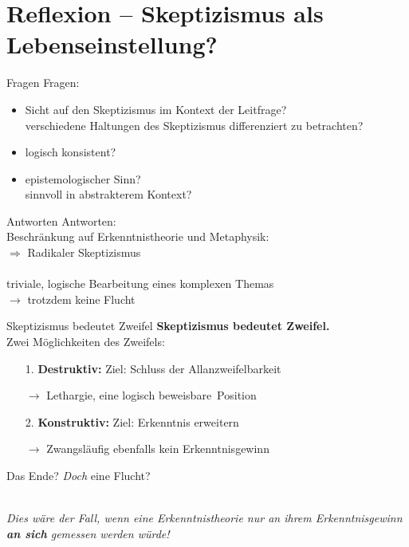 \documentclass[12pt]{beamer}
\begin{document}
\section{Reflexion – Skeptizismus als Lebenseinstellung?}
\begin{frame}{Fragen}
Fragen:
\begin{itemize}
\item Sicht auf den Skeptizismus im Kontext der Leitfrage?\\
verschiedene Haltungen des Skeptizismus differenziert zu betrachten?
\item logisch konsistent?
\item epistemologischer Sinn?\\
sinnvoll in abstrakterem Kontext? %
\end{itemize}
\end{frame}

\begin{frame}{Antworten}
Antworten:\\
Beschränkung auf Erkenntnistheorie und Metaphysik:\\
$\Rightarrow$ Radikaler Skeptizismus\\
\ \\
\glqq triviale\grqq , logische Bearbeitung eines komplexen Themas\\
$\rightarrow$ trotzdem keine \glqq Flucht\grqq
\end{frame}

\begin{frame}{Skeptizismus bedeutet Zweifel}
\textbf{Skeptizismus bedeutet Zweifel.}\\
Zwei Möglichkeiten des Zweifels:
\begin{itemize}
\item[1.] \textbf{Destruktiv:} Ziel: Schluss der Allanzweifelbarkeit
\item[$\rightarrow$] Lethargie, eine logisch \glqq beweisbare\grqq\ Position
\item[2.] \textbf{Konstruktiv:} Ziel: Erkenntnis erweitern
\item[$\rightarrow$] Zwangsläufig ebenfalls kein Erkenntnisgewinn
\end{itemize}
\end{frame}

\begin{frame}{Das Ende?}
\emph{Doch} eine Flucht?\\
\ \\
\begin{center}
\emph{Dies wäre der Fall, wenn eine Erkenntnistheorie nur an ihrem Erkenntnisgewinn \textbf{an sich} gemessen werden würde!}
\end{center}
\end{frame}
\end{document}
